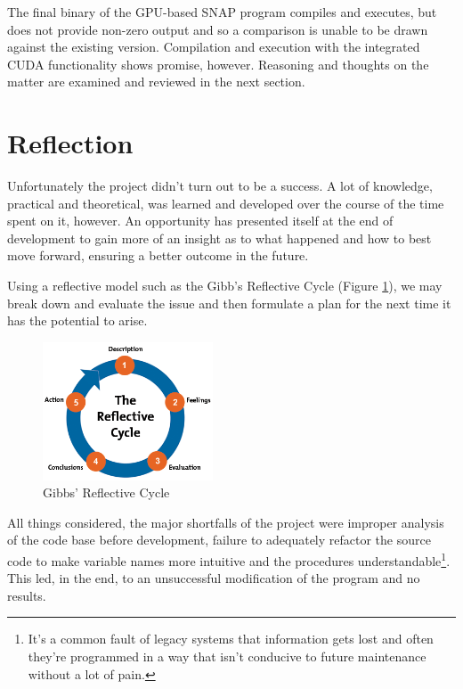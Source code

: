 \documentclass[conference]{IEEEtran}
\begin{document}
The final binary of the GPU-based SNAP program compiles and executes, but does not provide non-zero output and so a comparison is unable to be drawn against the existing version. Compilation and execution with the integrated CUDA functionality shows promise, however. Reasoning and thoughts on the matter are examined and reviewed in the next section.


\section{Reflection}
\label{sec:reflection}

Unfortunately the project didn't turn out to be a success. A lot of knowledge, practical and theoretical, was learned and developed over the course of the time spent on it, however. An opportunity has presented itself at the end of development to gain more of an insight as to what happened and how to best move forward, ensuring a better outcome in the future.

Using a reflective model such as the Gibb's Reflective Cycle (Figure \ref{fig:gibbscycle}), we may break down and evaluate the issue and then formulate a plan for the next time it has the potential to arise.

\begin{figure}[!h]
    \centering
    \includegraphics[width=0.45\textwidth]{images/gibbs-cycle.png}
    \caption{Gibbs' Reflective Cycle}
    \label{fig:gibbscycle}
\end{figure}

All things considered, the major shortfalls of the project were improper analysis of the code base before development, failure to adequately refactor the source code to make variable names more intuitive and the procedures understandable\footnote{It's a common fault of legacy systems that information gets lost and often they're programmed in a way that isn't conducive to future maintenance without a lot of pain.}. This led, in the end, to an unsuccessful modification of the program and no results.
\end{document}
